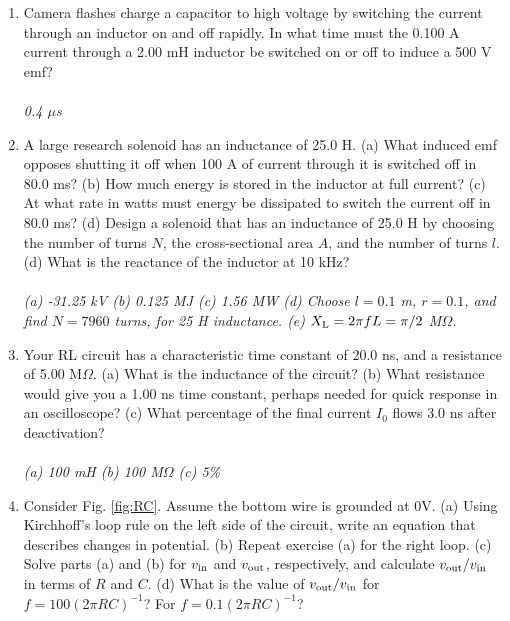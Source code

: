 \documentclass[12pt,twocolumn]{article}
\begin{document}
\begin{enumerate}
\textit{(a) The graph should be a sine function with labeled axes. (b) The added curve should be cosine function, a factor of 6 smaller in amplitude. (c) $V(t) = 0$ when $t = nT/2$, for $n = 0,1,2,...$.  We know that $T = 2\pi/\omega = 2\pi/(240\pi)$, so $T = 1/120$ sec.  Thus, $t_n = n/240$.}
\item Camera flashes charge a capacitor to high voltage by switching the current through an inductor on and off rapidly. In what time must the 0.100 A current through a 2.00 mH inductor be switched on or off to induce a 500 V emf? \\ \\
\textit{0.4 $\mu$s}
\item A large research solenoid has an inductance of 25.0 H. (a) What induced emf opposes shutting it off when 100 A of current through it is switched off in 80.0 ms? (b) How much energy is stored in the inductor at full current? (c) At what rate in watts must energy be dissipated to switch the current off in 80.0 ms? (d) Design a solenoid that has an inductance of 25.0 H by choosing the number of turns $N$, the cross-sectional area $A$, and the number of turns $l$. (d) What is the reactance of the inductor at 10 kHz? \\ \\
\textit{(a) -31.25 kV (b) 0.125 MJ (c) 1.56 MW (d) Choose $l = 0.1$ m, $r = 0.1$, and find $N = 7960$ turns, for 25 H inductance. (e) $X_{\rm L} = 2 \pi f L = \pi/2$ M$\Omega$.}
\item Your RL circuit has a characteristic time constant of 20.0 ns, and a resistance of 5.00 M$\Omega$. (a) What is the inductance of the circuit? (b) What resistance would give you a 1.00 ns time constant, perhaps needed for quick response in an oscilloscope? (c) What percentage of the final current $I_0$ flows 3.0 ns after deactivation? \\ \\
\textit{(a) 100 mH (b) 100 M$\Omega$ (c) 5\%}
\item Consider Fig. \ref{fig:RC}.  Assume the bottom wire is grounded at 0V.  (a) Using Kirchhoff's loop rule on the left side of the circuit, write an equation that describes changes in potential.  (b) Repeat exercise (a) for the right loop.  (c) Solve parts (a) and (b) for $v_{\rm in}$ and $v_{\rm out}$, respectively, and calculate $v_{\rm out}/v_{\rm in}$ in terms of $R$ and $C$.  (d) What is the value of $v_{\rm out}/v_{\rm in}$ for $f = 100(2\pi R C)^{-1}$? For $f = 0.1(2\pi R C)^{-1}$? \\ \\

\end{enumerate}
\end{document}
